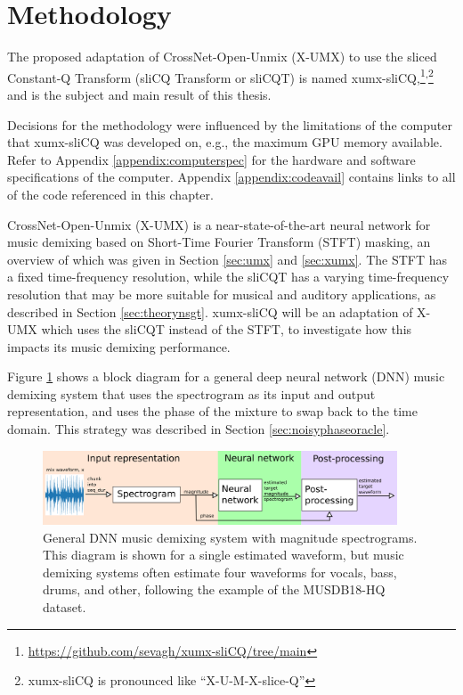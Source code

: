 \documentclass[report.tex]{subfiles}
\begin{document}
\section{Methodology}
\label{ch:methodology}

The proposed adaptation of CrossNet-Open-Unmix (X-UMX) to use the sliced Constant-Q Transform (sliCQ Transform or sliCQT) is named xumx-sliCQ,\footnote{\url{https://github.com/sevagh/xumx-sliCQ/tree/main}}\textsuperscript{,}\footnote{xumx-sliCQ is pronounced like ``X-U-M-X-slice-Q''} and is the subject and main result of this thesis.

Decisions for the methodology were influenced by the limitations of the computer that xumx-sliCQ was developed on, e.g., the maximum GPU memory available. Refer to Appendix \ref{appendix:computerspec} for the hardware and software specifications of the computer. Appendix \ref{appendix:codeavail} contains links to all of the code referenced in this chapter.

CrossNet-Open-Unmix (X-UMX) is a near-state-of-the-art neural network for music demixing based on Short-Time Fourier Transform (STFT) masking, an overview of which was given in Section \ref{sec:umx} and \ref{sec:xumx}. The STFT has a fixed time-frequency resolution, while the sliCQT has a varying time-frequency resolution that may be more suitable for musical and auditory applications, as described in Section \ref{sec:theorynsgt}. xumx-sliCQ will be an adaptation of X-UMX which uses the sliCQT instead of the STFT, to investigate how this impacts its music demixing performance.

Figure \ref{fig:generalmdx} shows a block diagram for a general deep neural network (DNN) music demixing system that uses the spectrogram as its input and output representation, and uses the phase of the mixture to swap back to the time domain. This strategy was described in Section \ref{sec:noisyphaseoracle}.

\begin{figure}[ht]
	\centering
	\includegraphics[width=0.9375\textwidth]{./images-blockdiagrams/generic_mdx.png}
	\caption{General DNN music demixing system with magnitude spectrograms. This diagram is shown for a single estimated waveform, but music demixing systems often estimate four waveforms for vocals, bass, drums, and other, following the example of the MUSDB18-HQ dataset.}
	\label{fig:generalmdx}
\end{figure}
\end{document}
